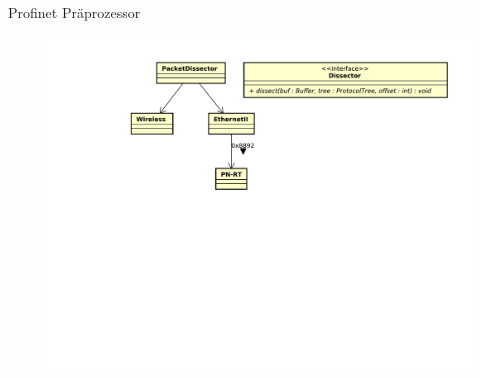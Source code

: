 \begin{frame}{Profinet Präprozessor}
    \begin{figure}
    	\centering
    	\includegraphics[width=\textwidth]{./images/dissector/4.pdf}
    \end{figure}
\end{frame}
